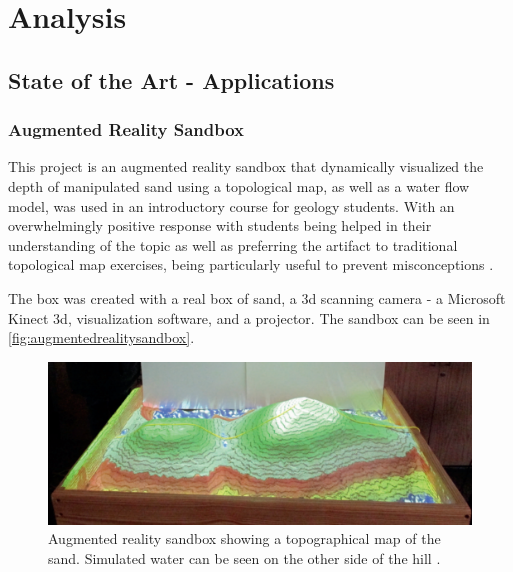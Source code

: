 \chapter{Analysis}\label{chap:analysis}

\section{State of the Art - Applications}
\subsection{Augmented Reality Sandbox} %

This project is an augmented reality sandbox that dynamically visualized the depth of manipulated sand using a topological map, as well as a water flow model, was used in an introductory course for geology students. With an overwhelmingly positive response with students being helped in their understanding of the topic as well as preferring the artifact to traditional topological map exercises, being particularly useful to prevent misconceptions \cite{woods2016pilot}.

The box was created with a real box of sand, a 3d scanning camera - a Microsoft Kinect 3d,  visualization software, and a projector.  The sandbox can be seen in \autoref{fig:augmentedrealitysandbox}.

\begin{figure}[H]
	\centering
	\includegraphics[width=0.9\linewidth]{figure/Analysis/augmentedrealitysandbox.png}
	\caption{Augmented reality sandbox showing a topographical map of the sand. Simulated water can be seen on the other side of the hill \cite{woods2016pilot}.}
	\label{fig:augmentedrealitysandbox}
\end{figure}


    
